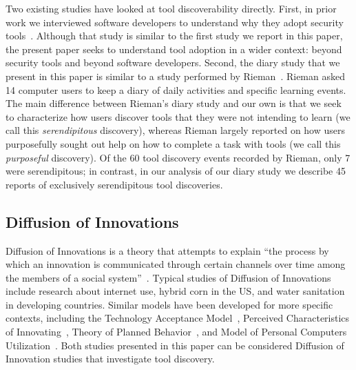 \documentclass[smallextended]{svjour3}
\begin{document}
\noindent
Two existing studies have looked at tool discoverability directly.
First, in prior work we interviewed software developers to 
understand why they adopt security tools~\citep{xiao}.
Although that study is similar to the first study we report in this paper, 
the present paper seeks to understand
tool adoption in a wider context: beyond security tools and beyond software developers.
Second, the diary study that we present in this paper is similar to 
a study performed by Rieman~\citeyearpar{rieman}.
Rieman asked 14 computer users to keep a diary of
daily activities and specific learning events.
The main difference between Rieman's diary study and our
own is that we seek to characterize how users discover tools
that they were not intending to learn (we call this \emph{serendipitous} discovery), 
whereas Rieman largely reported on how users purposefully sought out help
on how to complete a task with tools (we call this \emph{purposeful} discovery).
Of the 60 tool discovery events recorded by Rieman, 
only 7 were serendipitous; in contrast, in our analysis of our diary
study we describe 45 reports of exclusively serendipitous tool discoveries.

\subsection{Diffusion of Innovations}

\noindent Diffusion of Innovations is a theory that attempts to explain ``the
process by which an innovation is communicated through certain channels over
time among the members of a social system''~\citep{rogers03}.
Typical studies of Diffusion of Innovations include research about internet use,
hybrid corn in the US, and water sanitation in developing countries.
Similar models have been developed for more specific contexts, including 
the Technology Acceptance Model~\citep{DAVI89,VENK00}, Perceived
Characteristics of Innovating~\citep{MOOR91}, Theory of Planned
Behavior~\citep{AJZE91}, and Model of Personal Computers
Utilization~\citep{THOM91}.
Both studies presented in this paper can be considered Diffusion of Innovation
studies that investigate tool discovery.
\end{document}
